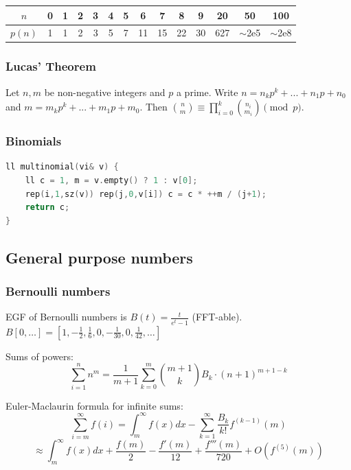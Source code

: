 \begin{multicols}{\Columns}
		\begin{center}
		\begin{tabular}{c|c@{\ }c@{\ }c@{\ }c@{\ }c@{\ }c@{\ }c@{\ }c@{\ }c@{\ }c@{\ }c@{\ }c@{\ }c}
			$n$    & 0 & 1 & 2 & 3 & 4 & 5 & 6  & 7  & 8  & 9  & 20  & 50  & 100 \\ \hline
			$p(n)$ & 1 & 1 & 2 & 3 & 5 & 7 & 11 & 15 & 22 & 30 & 627 & $\mathtt{\sim}$2e5 & $\mathtt{\sim}$2e8 \\
		\end{tabular}
		\end{center}

	\subsubsection{Lucas' Theorem}
		Let $n,m$ be non-negative integers and $p$ a prime. Write $n=n_kp^k+...+n_1p+n_0$ and $m=m_kp^k+...+m_1p+m_0$. Then $\binom{n}{m} \equiv \prod_{i=0}^k\binom{n_i}{m_i} \pmod{p}$.

	\subsubsection{Binomials}
\begin{lstlisting}[language=C++]
ll multinomial(vi& v) {
	ll c = 1, m = v.empty() ? 1 : v[0];
	rep(i,1,sz(v)) rep(j,0,v[i]) c = c * ++m / (j+1);
	return c;
}
\end{lstlisting}


\subsection{General purpose numbers}
	\subsubsection{Bernoulli numbers}
		EGF of Bernoulli numbers is $B(t)=\frac{t}{e^t-1}$ (FFT-able).
		$B[0,\ldots] = [1, -\frac{1}{2}, \frac{1}{6}, 0, -\frac{1}{30}, 0, \frac{1}{42}, \ldots]$

		Sums of powers:
		\small
		\[ \sum_{i=1}^n n^m = \frac{1}{m+1} \sum_{k=0}^m \binom{m+1}{k} B_k \cdot (n+1)^{m+1-k} \]
		\normalsize

		Euler-Maclaurin formula for infinite sums:
		\small
		\[ \sum_{i=m}^{\infty} f(i) = \int_m^\infty f(x) dx - \sum_{k=1}^\infty \frac{B_k}{k!}f^{(k-1)}(m) \]
		\[ \approx \int_{m}^\infty f(x)dx + \frac{f(m)}{2} - \frac{f'(m)}{12} + \frac{f'''(m)}{720} + O(f^{(5)}(m)) \]
		\normalsize


\end{multicols}
